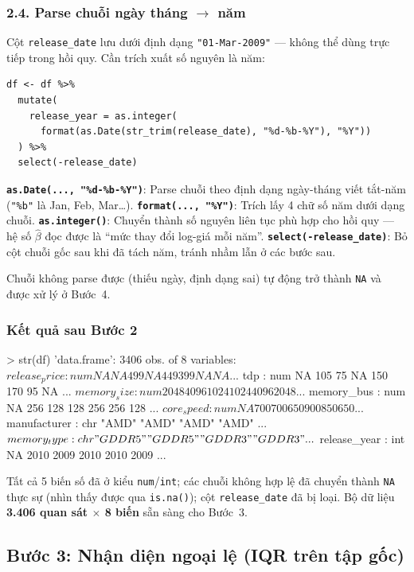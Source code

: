 \documentclass[a4paper]{article}
\begin{document}
\subsubsection*{2.4. Parse chuỗi ngày tháng $\to$ năm}

Cột \texttt{release\_date} lưu dưới định dạng \texttt{"01-Mar-2009"} --- không thể dùng trực tiếp trong hồi quy. Cần trích xuất số nguyên là năm:

\begin{verbatim}
df <- df %>%
  mutate(
    release_year = as.integer(
      format(as.Date(str_trim(release_date), "%d-%b-%Y"), "%Y"))
  ) %>%
  select(-release_date)
\end{verbatim}

\textbf{\texttt{as.Date(..., "\%d-\%b-\%Y")}}: Parse chuỗi theo định dạng ngày-tháng viết tắt-năm (\texttt{"\%b"} là Jan, Feb, Mar\ldots). \textbf{\texttt{format(..., "\%Y")}}: Trích lấy 4 chữ số năm dưới dạng chuỗi. \textbf{\texttt{as.integer()}}: Chuyển thành số nguyên liên tục phù hợp cho hồi quy --- hệ số $\hat{\beta}$ đọc được là ``mức thay đổi log-giá mỗi năm''. \textbf{\texttt{select(-release\_date)}}: Bỏ cột chuỗi gốc sau khi đã tách năm, tránh nhầm lẫn ở các bước sau.

Chuỗi không parse được (thiếu ngày, định dạng sai) tự động trở thành \texttt{NA} và được xử lý ở Bước~4.

\subsubsection*{Kết quả sau Bước 2}

\begin{rconsole}
> str(df)
'data.frame':  3406 obs. of  8 variables:
 $ release_price: num  NA NA 499 NA 449 399 NA NA ...
 $ tdp          : num  NA 105 75 NA 150 170 95 NA ...
 $ memory_size  : num  2048 4096 1024 1024 4096 2048 ...
 $ memory_bus   : num  NA 256 128 128 256 256 128 ...
 $ core_speed   : num  NA 700 700 650 900 850 650 ...
 $ manufacturer : chr  "AMD" "AMD" "AMD" "AMD" ...
 $ memory_type  : chr  "GDDR5" "GDDR5" "GDDR3" "GDDR3" ...
 $ release_year : int  NA 2010 2009 2010 2010 2009 ...
\end{rconsole}

Tất cả 5 biến số đã ở kiểu \texttt{num}/\texttt{int}; các chuỗi không hợp lệ đã chuyển thành \texttt{NA} thực sự (nhìn thấy được qua \texttt{is.na()}); cột \texttt{release\_date} đã bị loại. Bộ dữ liệu \textbf{3.406 quan sát $\times$ 8 biến} sẵn sàng cho Bước~3.

\subsection{Bước 3: Nhận diện ngoại lệ (IQR trên tập gốc)}
\end{document}
